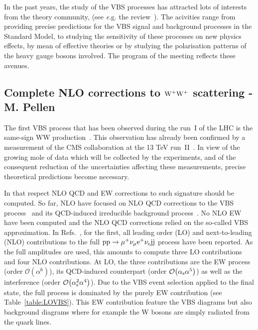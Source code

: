 
In the past years, the study of the VBS processes has attracted lots of interests from the theory community, (see {\emph e.g.} the review~\cite{Rauch:2016pai}).
The acivities range from providing precise predictions for the VBS signal and background processes in the Standard Model, to studying the sensitivity of these 
processes on new physics effects, by mean of effective theories or by studying the polarisation patterns of the heavy gauge bosons involved.
The program of the meeting reflects these avenues.

\subsection{Complete NLO corrections to ${\rm W^+ W^+}$ scattering - M. Pellen}

The first VBS process that has been observed during the run~I of the LHC is the same-sign WW production~\cite{Aad:2014zda,Aaboud:2016ffv,Khachatryan:2014sta}.
This observation has already been confirmed by a measurement of the CMS collaboration at the 13 TeV run~II~\cite{CMS:2017adb}.
In view of the growing mole of data which will be collected by the experiments, and of the consequent reduction of the uncertainties affecting these measurements, precise theoretical predictions become necessary.

In that respect NLO QCD and EW corrections to such signature should be computed.
So far, NLO have focused on NLO QCD corrections to the VBS process~\cite{Jager:2009xx,Jager:2011ms,Denner:2012dz,Rauch:2016pai} and its QCD-induced irreducible background process~\cite{Melia:2010bm,Melia:2011gk,Campanario:2013gea,Baglio:2014uba,Rauch:2016pai}.
No NLO EW have been computed and the NLO QCD corrections relied on the so-called VBS approximation.
In Refs.~\cite{Biedermann:2016yds,Biedermann:2017bss}, for the first, all leading order (LO) and next-to-leading (NLO) contributions to the full ${\rm p}{\rm p}\to\mu^+\nu_\mu{\rm e}^+\nu_{\rm e}{\rm j}{\rm j}$ process have been reported.
As the full amplitudes are used, this amounts to compute three LO contributions and four NLO contributions.
At LO, the three contributions are the EW process (order $\mathcal{O}{\left(\alpha^{6}\right)}$), its QCD-induced counterpart (order $\mathcal{O}{\left(\alpha_{\rm s}\alpha^{5}\right)}$) as well as the interference (order $\mathcal{O}{\left(\alpha_{\rm s}^2\alpha^{4}\right)}$).
Due to the VBS event selection applied to the final state, the full process is dominated by the purely EW contribution (see Table~\ref{table:LOVBS}).
This EW contribution feature the VBS diagrams but also background diagrams where for example the W bosons are simply radiated from the quark lines.

